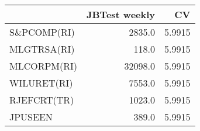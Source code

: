 \begin{tabular}{lrr}
\toprule
{} &  JBTest weekly &      CV \\
\midrule
S\&PCOMP(RI) &         2835.0 &  5.9915 \\
MLGTRSA(RI) &          118.0 &  5.9915 \\
MLCORPM(RI) &        32098.0 &  5.9915 \\
WILURET(RI) &         7553.0 &  5.9915 \\
RJEFCRT(TR) &         1023.0 &  5.9915 \\
JPUSEEN     &          389.0 &  5.9915 \\
\bottomrule
\end{tabular}
